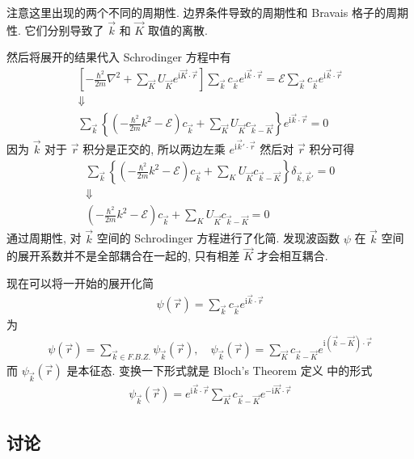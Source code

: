 \documentclass{ctexart}
\begin{document}
注意这里出现的两个不同的周期性. 边界条件导致的周期性和 Bravais 格子的周期性.
它们分别导致了 $\vec{k}$ 和 $\vec{K}$ 取值的离散.

然后将展开的结果代入 Schrodinger 方程中有
\begin{align*}
  \left[ -\frac{\hbar^2}{2m}\nabla^2 + \sum_{\vec{K}} U_{\vec{K}} e^{\mathrm{i} \vec{K}\cdot \vec{r}} \right]
  \sum_{\vec{k}} c_{\vec{k}} e^{\mathrm{i}\vec{k}\cdot \vec{r}} = \mathcal{E} \sum_{\vec{k}} c_{\vec{k}} e^{\mathrm{i}\vec{k}\cdot \vec{r}}\\
  \Downarrow \\
  \sum_{\vec{k}}\left\{ \left( -\frac{\hbar^2}{2m}k^2 -\mathcal{E} \right)c_{\vec{k}} +\sum_{\vec{K}}U_{\vec{K}}c_{\vec{k}-\vec{K}} \right\}
  e^{\mathrm{i}\vec{k}\cdot \vec{r}} = 0
\end{align*}
因为 $\vec{k}$ 对于 $\vec{r}$ 积分是正交的, 所以两边左乘 $e^{\mathrm{i}\vec{k}'\cdot \vec{r}}$
然后对 $\vec{r}$ 积分可得
\begin{align*}
  \sum_{\vec{k}} \left\{ \left( -\frac{\hbar^2}{2m}k^2 -\mathcal{E} \right) c_{\vec{k}} +
  \sum_K U_{\vec{K}} c_{\vec{k}-\vec{K}} \right\} \delta_{\vec{k},\vec{k}'} = 0 \\
  \Downarrow \\
   \left( -\frac{\hbar^2}{2m}k^2 -\mathcal{E} \right) c_{\vec{k}} +
  \sum_K U_{\vec{K}} c_{\vec{k}-\vec{K}}  = 0
\end{align*}
通过周期性, 对 $\vec{k}$ 空间的 Schrodinger 方程进行了化简. 发现波函数 $\psi$ 在 $\vec{k}$
空间的展开系数并不是全部耦合在一起的, 只有相差 $\vec{K}$ 才会相互耦合.

现在可以将一开始的展开化简
\begin{align*}
  \psi(\vec{r}) = \sum_{\vec{k}} c_{\vec{k}} e^{\mathrm{i}\vec{k}\cdot \vec{r}}
\end{align*}
为
\begin{align*}
  \psi(\vec{r}) = \sum_{\vec{k}\in F.B.Z.} \psi_{\vec{k}}(\vec{r}), \quad
  \psi_{\vec{k}}(\vec{r}) = \sum_{\vec{K}} c_{\vec{k}-\vec{K}}e^{\mathrm{i}(\vec{k}-\vec{K})\cdot \vec{r}}
\end{align*}
而 $\psi_{\vec{k}}(\vec{r})$ 是本征态. 变换一下形式就是 Bloch's Theorem 定义
中的形式
\begin{align*}
  \psi_{\vec{k}}(\vec{r}) = e^{\mathrm{i}\vec{k}\cdot \vec{r}} \sum_{\vec{K}}c_{\vec{k}-\vec{K}}e^{-\mathrm{i}\vec{K}\cdot \vec{r}}
\end{align*}

\subsection{讨论}
\end{document}

